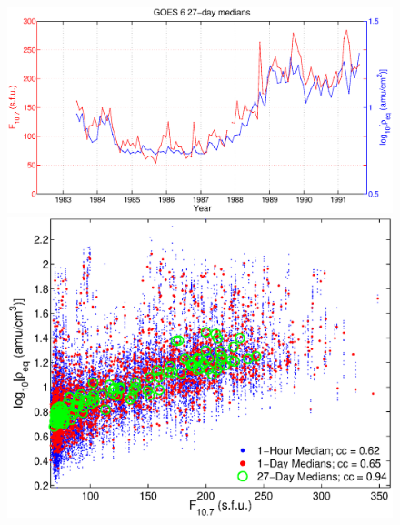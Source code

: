 \documentclass[12pt]{article}
\begin{document}
	\begin{figure}[htp!]
		\centering
		\includegraphics[scale=0.40]{2016SW001507R-p02a.eps}
		\includegraphics[scale=0.40]{2016SW001507R-p02b.eps}
	\end{figure}
	\clearpage
	
\end{document}
